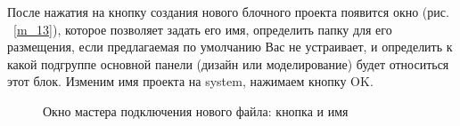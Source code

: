 \documentclass[a4paper,oneside ,14pt]{extreport}
\begin{document}
После нажатия на кнопку создания нового блочного проекта появится окно 
(рис. ~\ref{m_13}), которое позволяет задать его имя, определить папку для его размещения, 
если предлагаемая по умолчанию Вас не устраивает, и определить к какой 
подгруппе основной панели (дизайн или моделирование) будет относиться этот 
блок. Изменим имя проекта на system, нажимаем кнопку OK.

\begin{figure}[htbp]	
	\caption{Окно мастера подключения нового файла: кнопка и имя} %
\end{figure}
\end{document}
